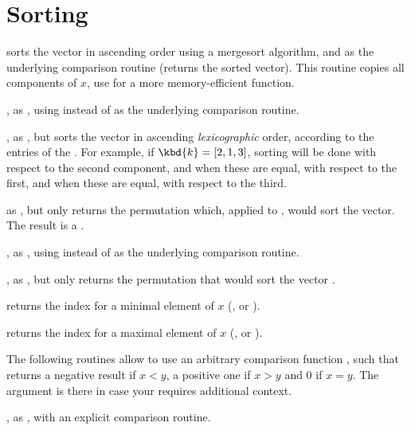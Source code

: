 
\section{Sorting}


 sorts the vector  in ascending order using a
mergesort algorithm, and  as the underlying comparison routine
(returns the sorted vector). This routine copies all components of $x$, use
 for a more memory-efficient function.

, as , using  instead of
 as the underlying comparison routine.

, as , but sorts the
vector  in ascending \emph{lexicographic} order, according to the
entries of the  . For example,  if $\kbd{k} = [2,1,3]$,
sorting will be done with respect to the second component,  and when these
are  equal, with respect to the first,  and when these are equal,  with
respect to the third.


 as , but only returns the permutation
which, applied to , would sort the vector. The result is a
.

, as , using 
instead of  as the underlying comparison routine.

, as , but only
returns the permutation that would sort the vector .

 returns the index for a minimal element of $x$
(,  or ).

 returns the index for a maximal element of $x$
(,  or ).

 The following routines allow to use an
arbitrary comparison function ,
such that  returns a negative result if $x
< y$, a positive one if $x > y$ and 0 if $x = y$. The  argument is
there in case your  requires additional context.

, as
, with an explicit comparison routine.

